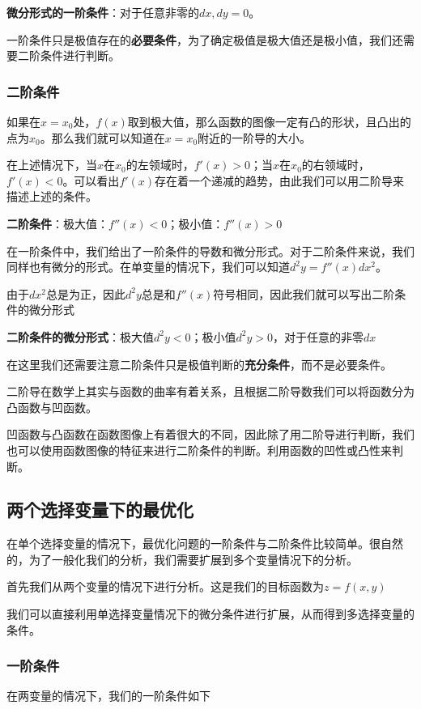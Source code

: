 \documentclass[UTF8,12pt]{ctexart}
\numberwithin{equation}{section} %
\numberwithin{figure}{section}
\numberwithin{table}{section}
\begin{document}
	\textbf{微分形式的一阶条件}：对于任意非零的$dx,dy = 0$。
	
	一阶条件只是极值存在的\textbf{必要条件}，为了确定极值是极大值还是极小值，我们还需要二阶条件进行判断。
	
	\subsubsection{二阶条件}
	
	如果在$x = x_0$处，$f(x)$取到极大值，那么函数的图像一定有凸的形状，且凸出的点为$x_0$。那么我们就可以知道在$x = x_0$附近的一阶导的大小。
	
	在上述情况下，当$x$在$x_0$的左领域时，$f'(x) > 0$；当$x$在$x_0$的右领域时，$f'(x) < 0$。可以看出$f'(x)$存在着一个递减的趋势，由此我们可以用二阶导来描述上述的条件。
	
	\textbf{二阶条件}：极大值：$f''(x) < 0$；极小值：$f''(x) > 0$
	
	在一阶条件中，我们给出了一阶条件的导数和微分形式。对于二阶条件来说，我们同样也有微分的形式。在单变量的情况下，我们可以知道$d^2y = f''(x)dx^2$。
	
	由于$dx^2$总是为正，因此$d^2y$总是和$f''(x)$符号相同，因此我们就可以写出二阶条件的微分形式
	
	\textbf{二阶条件的微分形式}：极大值$d^2y < 0$；极小值$d^2y > 0$，对于任意的非零$dx$
	
	在这里我们还需要注意二阶条件只是极值判断的\textbf{充分条件}，而不是必要条件。
	
	二阶导在数学上其实与函数的曲率有着关系，且根据二阶导数我们可以将函数分为凸函数与凹函数。
	
	凹函数与凸函数在函数图像上有着很大的不同，因此除了用二阶导进行判断，我们也可以使用函数图像的特征来进行二阶条件的判断。利用函数的凹性或凸性来判断。
	
	\subsection{两个选择变量下的最优化}
	
	在单个选择变量的情况下，最优化问题的一阶条件与二阶条件比较简单。很自然的，为了一般化我们的分析，我们需要扩展到多个变量情况下的分析。
	
	首先我们从两个变量的情况下进行分析。这是我们的目标函数为$z = f(x,y)$
	
	我们可以直接利用单选择变量情况下的微分条件进行扩展，从而得到多选择变量的条件。
	
	\subsubsection{一阶条件}
	在两变量的情况下，我们的一阶条件如下
	
\end{document}
